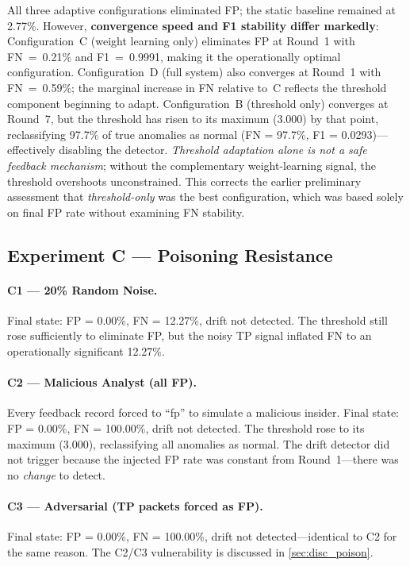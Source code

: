 \documentclass[preprint,12pt,authoryear]{elsarticle}
\begin{document}
All three adaptive configurations eliminated FP; the static baseline remained
at 2.77\%. However, \textbf{convergence speed and F1 stability differ markedly}:
Configuration~C (weight learning only) eliminates FP at Round~1 with FN~=~0.21\%
and F1~=~0.9991, making it the operationally optimal configuration.
Configuration~D (full system) also converges at Round~1 with FN~=~0.59\%;
the marginal increase in FN relative to~C reflects the threshold component
beginning to adapt.
Configuration~B (threshold only) converges at Round~7, but the threshold has
risen to its maximum (3.000) by that point, reclassifying 97.7\% of true
anomalies as normal (FN = 97.7\%, F1 = 0.0293)---effectively disabling the
detector. \emph{Threshold adaptation alone is not a safe feedback mechanism};
without the complementary weight-learning signal, the threshold overshoots
unconstrained. This corrects the earlier preliminary assessment that
\emph{threshold-only} was the best configuration, which was based solely on
final FP rate without examining FN stability.

\subsection{Experiment C --- Poisoning Resistance}
\label{subsec:exp_c}

\paragraph{C1 --- 20\% Random Noise.}
Final state: FP = 0.00\%, FN = 12.27\%, drift not detected. The threshold still
rose sufficiently to eliminate FP, but the noisy TP signal inflated FN to an
operationally significant 12.27\%.

\paragraph{C2 --- Malicious Analyst (all FP).}
Every feedback record forced to ``fp'' to simulate a malicious insider.
Final state: FP = 0.00\%, FN = 100.00\%, drift not detected. The threshold rose
to its maximum (3.000), reclassifying all anomalies as normal. The drift
detector did not trigger because the injected FP rate was constant from
Round~1---there was no \emph{change} to detect.

\paragraph{C3 --- Adversarial (TP packets forced as FP).}
Final state: FP = 0.00\%, FN = 100.00\%, drift not detected---identical to C2
for the same reason. The C2/C3 vulnerability is discussed in
\cref{sec:disc_poison}.
\end{document}
